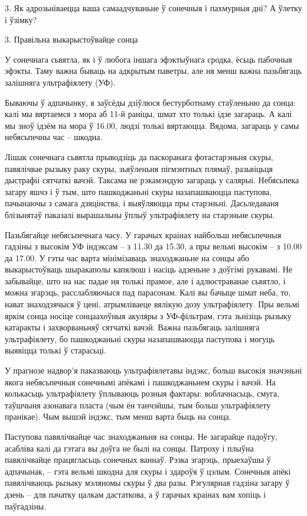 3. Як адрозьніваецца ваша самаадчуваньне ў сонечныя і пахмурныя дні? А ўлетку і ўзімку?


3. Правільна выкарыстоўвайце сонца

У сонечнага сьвятла, як і ў любога іншага эфэктыўнага сродка, ёсьць пабочныя эфэкты. Таму важна бываць на адкрытым паветры, але ня менш важна пазьбягаць залішняга ультрафіялету (УФ).

Бываючы ў адпачынку, я заўсёды дзіўлюся бестурботнаму стаўленьню да сонца: калі мы вяртаемся з мора аб 11-й раніцы, шмат хто толькі ідзе загараць. А калі мы зноў ідзём на мора ў 16.00, людзі толькі вяртаюцца. Вядома, загараць у самы небясьпечны час – шкодна.

Лішак сонечнага сьвятла прыводзіць да паскоранага фотастарэньня скуры, павялічвае рызыку раку скуры, зьяўленьня пігмэнтных плямаў, разьвіцьця дыстрафіі сятчаткі вачэй. Таксама не рэкамэндую загараць у салярыі. Небясьпека загару яшчэ і ў тым, што пашкоджаньні скуры назапашваюцца паступова, пачынаючы з самага дзяцінства, і выяўляюцца пры старэньні. Дасьледаваня блізьнятаў паказалі вырашальны ўплыў ультрафіялету на старэньне скуры.

Пазьбягайце небясьпечнага часу. У гарачых краінах найбольш небясьпечныя гадзіны з высокім УФ індэксам – з 11.30 да 15.30, а пры вельмі высокім – з 10.00 да 17.00. У гэты час варта мінімізаваць знаходжаньне на сонцы або выкарыстоўваць шыракаполы капялюш і насіць адзеньне з доўгімі рукавамі. Не забывайце, што на нас падае ня толькі прамое, але і адлюстраванае сьвятло, і можна згарэць, расслабляючыся пад парасонам. Калі вы бачыце шмат неба, то, нават знаходзячыся ў цені, атрымліваеце вялікую дозу ультрафіялету. Пры вельмі яркім сонца носіце сонцаахоўныя акуляры з УФ-фільтрам, гэта зьнізіць рызыку катаракты і захворваньняў сятчаткі вачэй. Важна пазьбягаць залішняга ультрафіялету, бо пашкоджаньні скуры назапашваюцца паступова і могуць выявіцца толькі ў старасьці.

У прагнозе надвор'я паказваюць ультрафіялетавы індэкс, больш высокія значэньні якога небясьпечныя сонечнымі апёкамі і пашкоджаньнем скуры і вачэй. На колькасьць ультрафіялету ўплываюць розныя фактары: воблачнасьць, смуга, таўшчыня азонавага пласта (чым ён танчэйшы, тым больш ультрафіялету пранікае). Чым вышэй індэкс, тым менш варта быць на сонца.

Паступова павялічвайце час знаходжаньня на сонцы. Не загарайце падоўгу, асабліва калі да гэтага вы доўга не былі на сонцы. Патроху і плыўна павялічвайце працягласьць сонечных ваннаў. Рэзка згарэць, прыехаўшы ў адпачынак, – гэта вельмі шкодна для скуры і здароўя ў цэлым. Сонечныя апёкі павялічваюць рызыку мэляномы скуры ў два разы. Рэгулярная гадзіна загару ў дзень – для пачатку цалкам дастаткова, а ў гарачых краінах вам хопіць і паўгадзіны.

